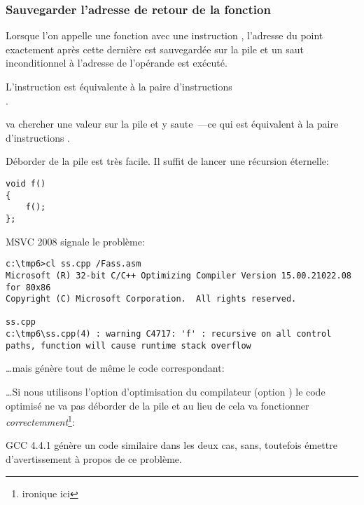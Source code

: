 ﻿\subsubsection{Sauvegarder l'adresse de retour de la fonction}


Lorsque l'on appelle une fonction avec une instruction \CALL, l'adresse du point
exactement après cette dernière est sauvegardée sur la pile et un saut inconditionnel
à l'adresse de l'opérande \CALL est exécuté.

L'instruction \CALL est équivalente à la paire d'instructions\\
.

\RET va chercher une valeur sur la pile et y saute~---ce qui est équivalent à
la paire d'instructions .

\myindex{\Stack!\MLStackOverflow}
\myindex{\Recursion}
Déborder de la pile est très facile. Il suffit de lancer une récursion éternelle:

\begin{lstlisting}[style=customc]
void f()
{
	f();
};
\end{lstlisting}

MSVC 2008 signale le problème:

\begin{lstlisting}
c:\tmp6>cl ss.cpp /Fass.asm
Microsoft (R) 32-bit C/C++ Optimizing Compiler Version 15.00.21022.08 for 80x86
Copyright (C) Microsoft Corporation.  All rights reserved.

ss.cpp
c:\tmp6\ss.cpp(4) : warning C4717: 'f' : recursive on all control paths, function will cause runtime stack overflow
\end{lstlisting}

\dots mais génère tout de même le code correspondant:



\dots Si nous utilisons l'option d'optimisation du compilateur (option \TT{\Ox})
le code optimisé ne va pas déborder de la pile et au lieu de cela va fonctionner
\emph{correctemment}\footnote{ironique ici}:



GCC 4.4.1 génère un code similaire dans les deux cas, sans, toutefois émettre
d'avertissement à propos de ce problème.

